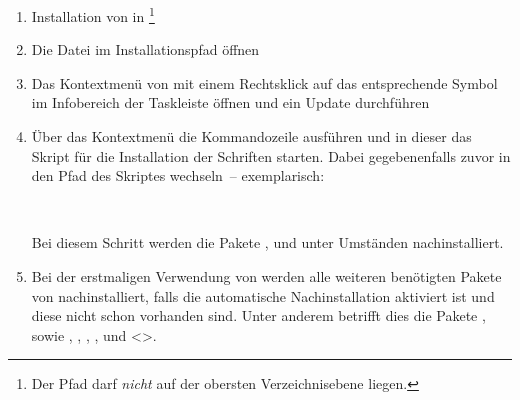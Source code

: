 %
\begin{enumerate}
\item Installation von  in 
  \footnote{Der Pfad darf \emph{nicht} auf der obersten Verzeichnisebene 
   liegen.
  }
\item Die Datei  im Installationspfad öffnen
\item Das Kontextmenü von  mit einem 
  Rechtsklick auf das entsprechende Symbol im Infobereich der Taskleiste öffnen 
  und ein Update durchführen
\item Über das Kontextmenü die Kommandozeile ausführen und in dieser das Skript 
  für die Installation der Schriften  starten.
  Dabei gegebenenfalls zuvor in den Pfad des Skriptes wechseln~-- exemplarisch:
  \begin{quoting}[leftmargin=1.5em,rightmargin=0pt]
  \newline
  \,
  \end{quoting}
  Bei diesem Schritt werden die Pakete ,  
  und  unter Umständen nachinstalliert.
\item Bei der erstmaligen Verwendung von \TUDScript werden alle weiteren 
  benötigten Pakete von  
  nachinstalliert, falls die automatische Nachinstallation aktiviert ist und 
  diese nicht schon vorhanden sind. Unter anderem betrifft dies die Pakete 
  ,  sowie , 
   , , 
  ,  und <>.  
\end{enumerate}
%

